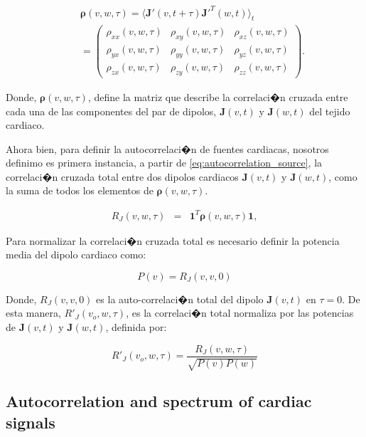  \begin{eqnarray}\label{eq:autocorrelation_source}
 &&\boldsymbol{\rho}(v,w,\tau)=\langle\mathbf{J'}(v,t+\tau)\mathbf{J'}^{T}(w,t)\rangle_t
 \nonumber \\
 &&= \left( \begin{array}{ccc}
 {\rho}_{xx}(v,w,\tau) & {\rho}_{xy}(v,w,\tau) & {\rho}_{xz}(v,w,\tau) \\
 {\rho}_{yx}(v,w,\tau) & {\rho}_{yy}(v,w,\tau) & {\rho}_{yz}(v,w,\tau) \\
 {\rho}_{zx}(v,w,\tau) & {\rho}_{zy}(v,w,\tau) & {\rho}_{zz}(v,w,\tau) 
 \end{array} \right).
 \end{eqnarray}

Donde, $\boldsymbol{\rho}(v,w,\tau)$, define la matriz  que describe la
correlaci�n cruzada entre cada una de las componentes del par de dipolos, 
$\mathbf{J}(v,t)$ y $\mathbf{J}(w,t)$ del  tejido cardiaco. 

Ahora bien, para definir la autocorrelaci�n de fuentes cardiacas,  nosotros
definimo es primera instancia, a partir de \ref{eq:autocorrelation_source}, la
correlaci�n cruzada  total  entre dos dipolos cardiacos $\mathbf{J}(v,t)$ y
$\mathbf{J}(w,t)$, como la suma de todos los elementos de $\boldsymbol{\rho}(v,w,\tau)$.

\begin{eqnarray} 
  R_{J}(v,w,\tau) &=&  \mathbf{1}^{T} \boldsymbol{\rho}(v,w,\tau) 
  \mathbf{1},\label{total_corr}
\end{eqnarray}



Para normalizar la correlaci�n cruzada total es necesario definir la potencia
media del dipolo cardiaco como:

\begin{equation}\label{eq:Potencia}
{P}(v) = {R_{J}}(v,v,0)
\end{equation}

Donde, ${R_{J}}(v,v,0)$  es la auto-correlaci�n total del dipolo $\mathbf{J}(v,t)$ en $\tau=0$. 
De esta manera, ${R'}_{J}(v_o,w,\tau)$, es la correlaci�n total normaliza por
las potencias de  $\mathbf{J}(v,t)$ y $\mathbf{J}(w,t)$, definida  por:

\begin{equation}\label{eq:RjN}
 {R'_{J}}(v_o,w,\tau)=\dfrac{{R_{J}}(v,w,\tau)}{\sqrt{P(v)P(w)}}
\end{equation}



\subsection{Autocorrelation and spectrum of cardiac signals}

